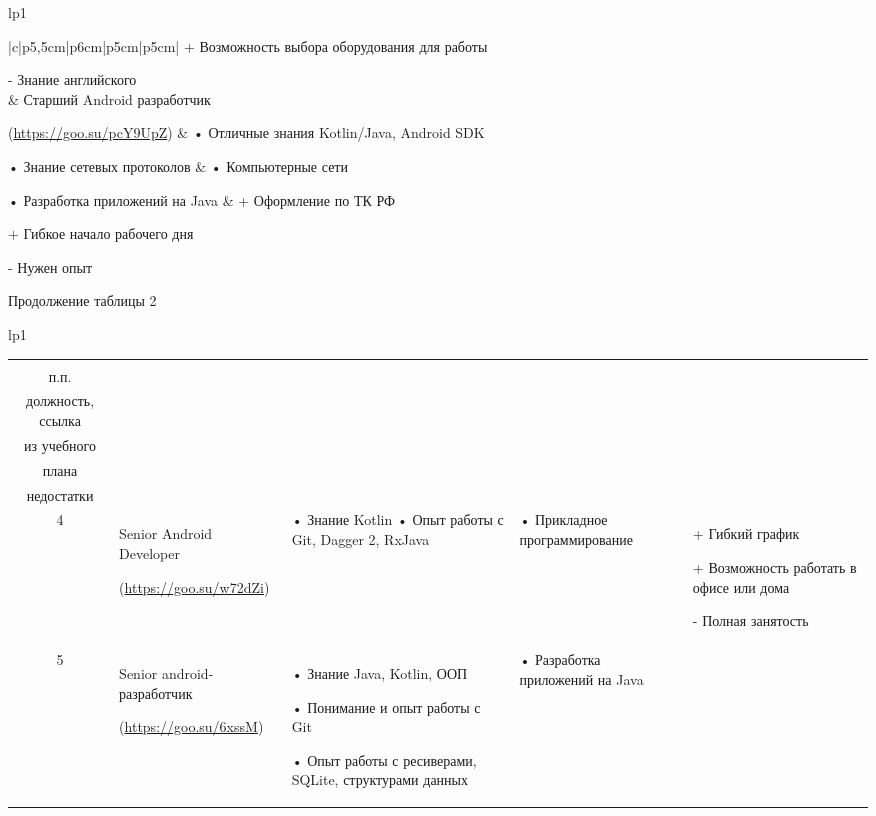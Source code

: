 \documentclass[14pt]{extreport}
\begin{document}
\begin{landscape}
\begin{longtable}[H]{lp{1\linewidth}}
\begin{small}
\begin{tabular}{|c|p{}|p{6cm}|p{5cm}|p{5cm}|}
+	Возможность выбора оборудования для работы

-	Знание английского\\
		& Старший Android разработчик 
	
(\url{https://goo.su/pcY9UpZ}) &
•	Отличные знания Kotlin/Java, Android SDK

•	Знание сетевых протоколов &
•	Компьютерные сети

•	Разработка приложений на Java &
+	Оформление по ТК РФ

+	Гибкое начало рабочего дня 

-	Нужен опыт \\


	\hline


    \end{tabular}
    \end{small}
\end{longtable}




\addtocounter{table}{-1}
\newpage
Продолжение таблицы 2
\begin{longtable}[H]{lp{1\linewidth}}
\caption{Продолжение таблицы 2}

\centering

\begin{small}


    \begin{tabular}{|c|p{}|p{6cm}|p{5cm}|p{5cm}|}
	\hline 
	\makecell{№ \\ п.п.} &	\makecell{Наименование,\\ должность, ссылка} &	\makecell{Требования} & 	\makecell{Дисциплины \\ из учебного \\плана} &	\makecell{Преимущества и \\недостатки}  \\ 
	\hline 
	4	& Senior Android Developer
	
(\url{https://goo.su/w72dZi}) &
•	Знание Kotlin 
•	Опыт работы с Git, Dagger 2, RxJava
& 
•	Прикладное программирование &
+	Гибкий график

+	Возможность работать в офисе или дома

-	Полная занятость \\

	\hline
5	& Senior android-разработчик 

(\url{https://goo.su/6xssM}) &
•	Знание Java, Kotlin, ООП

•	Понимание и опыт работы с Git

•	Опыт работы с ресиверами, SQLite, структурами данных &
•	Разработка приложений на Java


\end{tabular}
\end{small}
\end{longtable}
\end{landscape}
\end{document}
